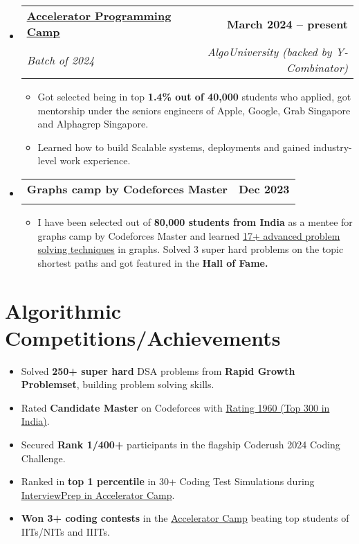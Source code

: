 \documentclass[letterpaper,11pt]{article}
\makeatletter
\newcommand{\resumeItem}[1]{
  \item\small{
    {#1 \vspace{-2pt}}
  }
}
\newcommand{\resumeSubheading}[4]{
  \vspace{-2pt}\item
    \begin{tabular*}{1.0\textwidth}[t]{l@{\extracolsep{\fill}}r}
      \textbf{#1} & \textbf{\small #2} \\
      \textit{\small#3} & \textit{\small #4} \\
    \end{tabular*}\vspace{-7pt}
}
\newcommand{\resumeSubHeadingListStart}{\begin{itemize}[leftmargin=0.0in, label={}]}
\newcommand{\resumeSubHeadingListEnd}{\end{itemize}}
\newcommand{\resumeItemListStart}{\begin{itemize}}
\newcommand{\resumeItemListEnd}{\end{itemize}\vspace{-5pt}}
\makeatother
\begin{document}
\resumeSubHeadingListStart
\resumeSubheading{\href{https://bit.ly/accelerator-2023}{\underline{Accelerator Programming Camp}}}{March 2024 -- present}{Batch of 2024}{AlgoUniversity (backed by Y-Combinator)}
\resumeItemListStart
\resumeItem{Got selected being in top \textbf{1.4\% out of 40,000} students who applied, got mentorship under the seniors engineers of Apple, Google, Grab Singapore and Alphagrep Singapore.}
\resumeItem{Learned how to build Scalable systems, deployments and gained industry-level work experience.}
\resumeItemListEnd
\resumeSubHeadingListEnd
\vspace{-5 mm}
\resumeSubHeadingListStart
\resumeSubheading{Graphs camp by Codeforces Master}{Dec 2023}{}{}
\resumeItemListStart
\vspace{-4mm}
\resumeItem{I have been selected out of \textbf{80,000 students from India} as a mentee for graphs camp by Codeforces Master and learned \underline{17+ advanced problem solving techniques} in graphs. Solved 3 super hard problems on the topic shortest paths and got featured in the \textbf{Hall of Fame.} }
\resumeItemListEnd

\resumeSubHeadingListEnd

\section{Algorithmic Competitions/Achievements}
\resumeItemListStart
\resumeItem{Solved \textbf{250+ super hard} DSA problems from \textbf{Rapid Growth Problemset}, building problem solving skills.}
\resumeItem{Rated \textbf{Candidate Master} on Codeforces with \underline{Rating 1960 (Top 300 in India)}.}
\resumeItem{Secured \textbf{Rank 1/400+} participants in the flagship Coderush 2024 Coding Challenge.}
\resumeItem{Ranked in \textbf{top 1 percentile} in 30+ Coding Test Simulations during  \href{https://bit.ly/accelerator-2023}{\underline{InterviewPrep in Accelerator Camp}}.}
\resumeItem{\textbf{Won 3+ coding contests} in the \href{https://bit.ly/accelerator-2023}{\underline{Accelerator Camp}} beating top students of IITs/NITs and IIITs.}

\resumeItemListEnd
\end{document}
